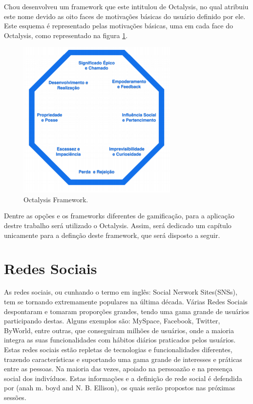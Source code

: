 Chou desenvolveu um framework que este intitulou de Octalysis, no qual atribuiu
este nome devido as oito faces de motivações básicas do usuário definido por ele.
Este esquema é representado pelas motivações básicas, uma em cada face do Octalysis,
como representado na figura \ref{fig:octalysisex}.

\begin{figure}[h]
    \centering
    \includegraphics[width=300px, scale=1]{figuras/octalysisex}
    \caption{Octalysis Framework.}
    \label{fig:octalysisex}
\end{figure}

Dentre as opções e os frameworks diferentes de gamificação, para a aplicação
destre trabalho será utilizado o Octalysis. Assim, será dedicado um capítulo
unicamente para a definção deste framework, que será disposto a seguir.



\section{Redes Sociais}
\label{sec:redessociais}
As redes sociais, ou cunhando o termo em inglês: Social Nerwork Sites(SNSs),
tem se tornando extremamente populares na última década. Várias
Redes Sociais despontaram e tomaram proporções grandes, tendo uma gama grande
de usuários participando destas. Alguns exemplos são: MySpace, Facebook, Twitter,
ByWorld, entre outras, que conseguiram milhões de usuários, onde a maioria integra
as suas funcionalidades com hábitos diários praticados pelos usuários.
Estas redes sociais estão repletas de tecnologias e funcionalidades diferentes,
trazendo características e suportando uma gama grande de interesses e práticas
entre as pessoas. Na maioria das vezes, apoiado na perssoazão e na presença social
dos indivíduos. Estas informações e a definição de rede social é defendida por
(anah m. boyd and N. B. Ellison), os quais serão propostos nas próximas sessões.
